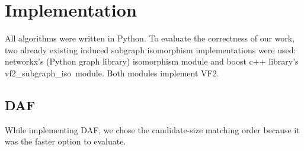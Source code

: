 \chapter{Implementation}

All algorithms were written in Python. To evaluate the correctness of our work, two already 
existing induced subgraph isomorphism implementations were used: networkx's (Python graph 
library) isomorphism module and boost c++ library's vf2\_subgraph\_iso\ module. Both modules
implement VF2.

\section{DAF}

While implementing DAF, we chose the candidate-size matching order because it was the faster
option to evaluate.